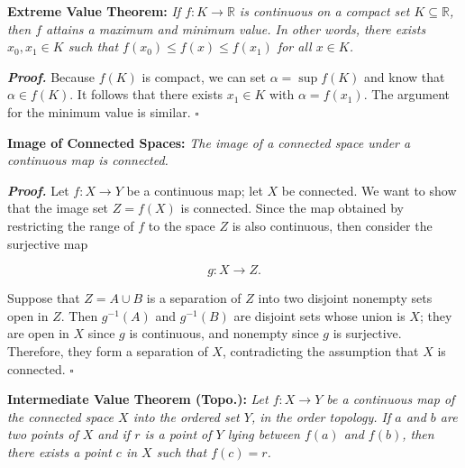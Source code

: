 \documentclass[12pt, a4paper]{article}
\begin{document}
\vspace{4mm}\par

\textbf{Extreme Value Theorem:} \textit{If $f\colon K\rightarrow\mathbb{R}$ is continuous on a compact set $K\subseteq\mathbb{R}$, then $f$ attains a maximum and minimum value. In other words, there exists $x_0,x_1\in K$ such that $f(x_0)\leq f(x)\leq f(x_1)$ for all $x\in K$.}

\begin{description}

    \item\textit{\textbf{Proof.}} Because $f(K)$ is compact, we can set $\alpha=\sup f(K)$ and know that $\alpha\in f(K)$. It follows that there exists $x_1\in K$ with $\alpha=f(x_1)$. The argument for the minimum value is similar. $\square$

\end{description}

\vspace{4mm}

\textbf{Image of Connected Spaces: } \textit{The image of a connected space under a continuous map is connected.}

\begin{description}
    \item\textit{\textbf{Proof.}} Let $f\colon X\rightarrow Y$ be a continuous map; let $X$ be connected. We want to show that the image set $Z=f(X)$ is connected. Since the map obtained by restricting the range of $f$ to the space $Z$ is also continuous, then consider the surjective map 
    
    \begin{equation*}
        g\colon X\rightarrow Z.
    \end{equation*}
    
    Suppose that $Z=A\cup B$ is a separation of $Z$ into two disjoint nonempty sets open in $Z$. Then $g^{-1}(A)$ and $g^{-1}(B)$ are disjoint sets whose union is $X$; they are open in $X$ since $g$ is continuous, and nonempty since $g$ is surjective. Therefore, they form a separation of $X$, contradicting the assumption that $X$ is connected. $\square$
\end{description}

\vspace{4mm}

\textbf{Intermediate Value Theorem (Topo.):} \textit{ Let $f\colon X\rightarrow Y$ be a continuous map of the connected space $X$ into the ordered set $Y$, in the order topology. If $a$ and $b$ are two points of $X$ and if $r$ is a point of $Y$ lying between $f(a)$ and $f(b)$, then there exists a point $c$ in $X$ such that $f(c)=r$.}
\end{document}
